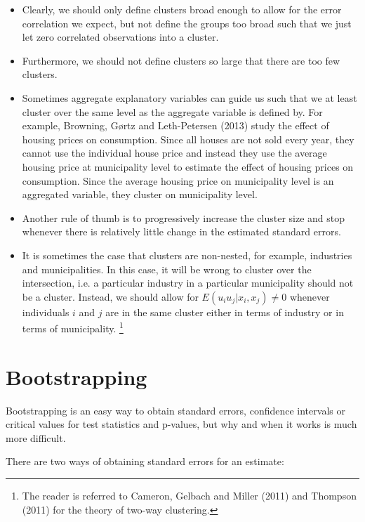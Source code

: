 \documentclass{article}
\begin{document}
\begin{itemize}
\item Clearly, we should only define clusters broad enough to allow for the
error correlation we expect, but not define the groups too broad such that
we just let zero correlated observations into a cluster.

\item Furthermore, we should not define clusters so large that there are too
few clusters.

\item Sometimes aggregate explanatory variables can guide us such that we at
least cluster over the same level as the aggregate variable is defined by.
For example, Browning, G\o rtz and Leth-Petersen (2013) study the effect of
housing prices on consumption. Since all houses are not sold every year,
they cannot use the individual house price and instead they use the average
housing price at municipality level to estimate the effect of housing prices
on consumption. Since the average housing price on municipality level is an
aggregated variable, they cluster on municipality level.

\item Another rule of thumb is to progressively increase the cluster size
and stop whenever there is relatively little change in the estimated
standard errors.

\item It is sometimes the case that clusters are non-nested, for example,
industries and municipalities. In this case, it will be wrong to cluster
over the intersection, i.e. a particular industry in a particular
municipality should not be a cluster. Instead, we should allow for $E\left(
u_{i}u_{j}|x_{i},x_{j}\right) \neq 0$ whenever individuals $i$ and $j$ are
in the same cluster either in terms of industry or in terms of municipality.%
\footnote{%
The reader is referred to Cameron, Gelbach and Miller (2011) and Thompson
(2011) for the theory of two-way clustering.}
\end{itemize}

\section{Bootstrapping}

Bootstrapping is an easy way to obtain standard errors, confidence intervals
or critical values for test statistics and p-values, but why and when it
works is much more difficult.

There are two ways of obtaining standard errors for an estimate:
\end{document}
